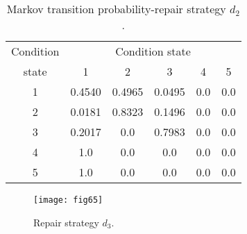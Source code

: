 \begin{table}[t]
\caption{Markov transition probability-repair strategy $d_2$.}
\label{table64}
\begin{center}
{\small
\begin{tabular}{l|lllll}
\hline
\multicolumn{1}{c|}{Condition} & \multicolumn{5}{c}{Condition state} \\ 
\multicolumn{1}{c|}{state} & \multicolumn{1}{c}{1} & \multicolumn{1}{c}{2} & \multicolumn{1}{c}{3} & \multicolumn{1}{c}{4} & \multicolumn{1}{c}{5} \\ 
\hline
\multicolumn{1}{c|}{1} & \multicolumn{1}{c}{0.4540} & \multicolumn{1}{c}{0.4965} & \multicolumn{1}{c}{0.0495} & \multicolumn{1}{c}{0.0} & \multicolumn{1}{c}{0.0} \\ 
\multicolumn{1}{c|}{2} & \multicolumn{1}{c}{0.0181} & \multicolumn{1}{c}{0.8323} & \multicolumn{1}{c}{0.1496} & \multicolumn{1}{c}{0.0} & \multicolumn{1}{c}{0.0} \\ 
\multicolumn{1}{c|}{3} & \multicolumn{1}{c}{0.2017} & \multicolumn{1}{c}{0.0} & \multicolumn{1}{c}{0.7983} & \multicolumn{1}{c}{0.0} & \multicolumn{1}{c}{0.0} \\ 
\multicolumn{1}{c|}{4} & \multicolumn{1}{c}{1.0} & \multicolumn{1}{c}{0.0} & \multicolumn{1}{c}{0.0} & \multicolumn{1}{c}{0.0} & \multicolumn{1}{c}{0.0} \\ 
\multicolumn{1}{c|}{5} & \multicolumn{1}{c}{1.0} & \multicolumn{1}{c}{0.0} & \multicolumn{1}{c}{0.0} & \multicolumn{1}{c}{0.0} & \multicolumn{1}{c}{0.0} \\ 
\hline
\end{tabular}
}
\end{center}
\end{table}
%
\begin{figure}[t]
\begin{center}
\texttt{[image: fig65]}
\end{center}
\caption{Repair strategy $d_3$.}
\label{fig65}
\end{figure}%
